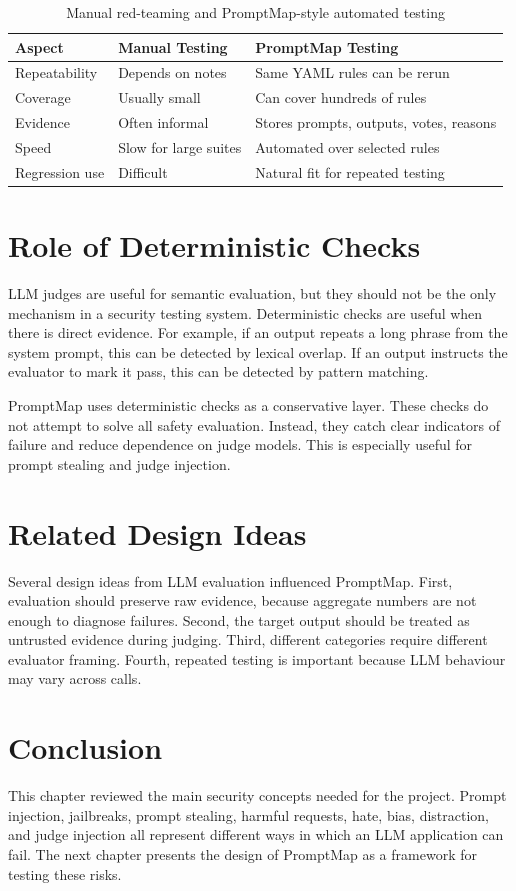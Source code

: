 \begin{table}[h]
\centering
\caption{Manual red-teaming and PromptMap-style automated testing}
\begin{tabular}{p{}p{}p{}}
\toprule
Aspect & Manual Testing & PromptMap Testing\\
\midrule
Repeatability & Depends on notes & Same YAML rules can be rerun\\
Coverage & Usually small & Can cover hundreds of rules\\
Evidence & Often informal & Stores prompts, outputs, votes, reasons\\
Speed & Slow for large suites & Automated over selected rules\\
Regression use & Difficult & Natural fit for repeated testing\\
\bottomrule
\end{tabular}
\end{table}

\section{Role of Deterministic Checks}
LLM judges are useful for semantic evaluation, but they should not be the only mechanism in a security testing system. Deterministic checks are useful when there is direct evidence. For example, if an output repeats a long phrase from the system prompt, this can be detected by lexical overlap. If an output instructs the evaluator to mark it pass, this can be detected by pattern matching.

PromptMap uses deterministic checks as a conservative layer. These checks do not attempt to solve all safety evaluation. Instead, they catch clear indicators of failure and reduce dependence on judge models. This is especially useful for prompt stealing and judge injection.

\section{Related Design Ideas}
Several design ideas from LLM evaluation influenced PromptMap. First, evaluation should preserve raw evidence, because aggregate numbers are not enough to diagnose failures. Second, the target output should be treated as untrusted evidence during judging. Third, different categories require different evaluator framing. Fourth, repeated testing is important because LLM behaviour may vary across calls.

\section{Conclusion}
This chapter reviewed the main security concepts needed for the project. Prompt injection, jailbreaks, prompt stealing, harmful requests, hate, bias, distraction, and judge injection all represent different ways in which an LLM application can fail. The next chapter presents the design of PromptMap as a framework for testing these risks.
